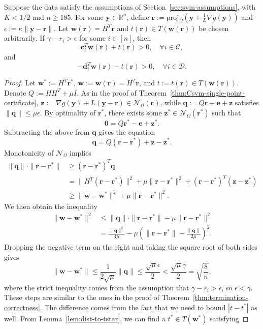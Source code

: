 \documentclass[twoside,11pt]{article}
\newcommand\proj{\mathrm{proj}}
\newcommand\bz{\bm{0}}
\renewcommand{\c}{\bm{c}}
\renewcommand{\d}{\bm{d}}
\newcommand{\R}{{\mathbb{R}}} %
\newcommand\q{\bm{q}}
\renewcommand\r{\bm{r}}
\newcommand\w{\bm{w}}
\newcommand\y{\bm{y}}
\newcommand\z{\bm{z}}
\newcommand\e{\bm{e}}
\newcommand\CC{\mathcal{C}}
\newcommand\DD{\mathcal{D}}
\newcommand\mN{\mathcal{N}}
\begin{document}
\begin{theorem} \label{thm:Csvm-termination-correctness}
    Suppose the data satisfy the assumptions of Section~\ref{sec:svm-assumptions}, with $K<1/2$ and $n \geq 185$. For some $\y \in \R^n$, define $\r := \proj_{\Omega}(\y + \frac{1}{L}\nabla g(\y))$ and $\epsilon := \kappa\|\y - \r\|$. Let $\w(\r) = H^T\r$ and $t(\r) \in T(\w(\r))$ be chosen arbitrarily. If $\gamma - r_i > \epsilon$ for some $i \in [n]$, then
    \[
        \c_i^T\w(\r) + t(\r) > 0,\quad \forall i \in \CC,
    \]
    and
    \[
        -\d_i^T\w(\r) - t(\r) > 0,\quad \forall i \in \DD.
    \]
\end{theorem}
\begin{proof}
    Let $\w^* := H^T\r^*$, $\w := \w(\r) = H^T\r$, and $t := t(\r) \in T(\w(\r))$. Denote $Q := HH^T + \mu I$. As in the proof of Theorem~\ref{thm:Csvm-single-point-certificate}, $\z := \nabla g(\y) + L(\y - \r) \in \mN_{\Omega}(\r)$, while $\q := Q\r - \e + \z$ satisfies $\|\q\| \leq \mu\epsilon$. By optimality of $\r^*$, there exists some $\z^* \in \mN_{\Omega}(\r^*)$ such that
    \[
        \bz = Q\r^* - \e + \z^*.
    \]
    Subtracting the above from $\q$ gives the equation
    \[
        \q = Q(\r - \r^*) + \z - \z^*.
    \]
    Monotonicity of $\mN_{\Omega}$ implies
    \begin{align*}
        \|\q\|\cdot\|\r - \r^*\| &\geq (\r - \r^*)^T\q\\
        &= \|H^T(\r - \r^*)\|^2 + \mu\|\r - \r^*\|^2 + (\r - \r^*)^T(\z - \z^*)\\
        &\geq \|\w - \w^*\|^2 + \mu\|\r - \r^*\|^2.
    \end{align*}
    We then obtain the inequality
    \begin{align*}
        \|\w - \w^*\|^2 &\leq \|\q\|\cdot\|\r - \r^*\| - \mu\|\r - \r^*\|^2\\
        &= \frac{\|\q\|^2}{4\mu} - \mu\left(\|\r - \r^*\| - \frac{\|\q\|}{2\mu}\right)^2.
    \end{align*}
    Dropping the negative term on the right and taking the square root of both sides gives
    \[
        \|\w - \w^*\| \leq \frac{1}{2\sqrt{\mu}}\|\q\| \leq \frac{\sqrt{\mu}\epsilon}{2} < \frac{\sqrt{\mu}\gamma}{2} = \sqrt{\frac{8}{n}},
    \]
    where the strict inequality comes from the assumption that $\gamma - r_i > \epsilon$, so $\epsilon < \gamma$. These steps are similar to the ones in the proof of Theorem~\ref{thm:termination-correctness}. The difference comes from the fact that we need to bound $|t - t^*|$ as well. From Lemma~\ref{lem:dist-to-tstar}, we can find a $t^* \in T(\w^*)$ satisfying

\end{proof}
\end{document}
